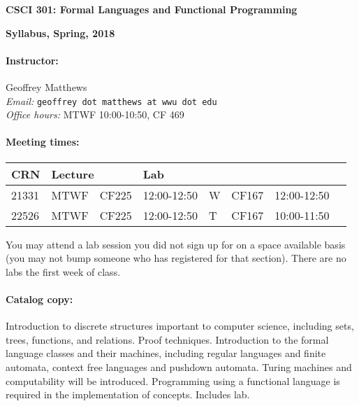 \documentclass{article}
\begin{document}
\centerline{\Large\bf CSCI 301: Formal Languages and Functional Programming}
\centerline{\large\bf Syllabus, Spring, 2018}

\paragraph{Instructor:} Geoffrey Matthews\\
{\em Email:} {\tt geoffrey dot matthews at wwu dot edu}\\
{\em Office hours:} MTWF 10:00-10:50, CF 469

\paragraph{Meeting times:} \mbox{}

  \begin{tabular}{l|ll|lllll}
    CRN & \multicolumn{2}{l|}{Lecture}
    & \multicolumn{3}{l}{Lab}   \\\hline
    21331 & MTWF & CF225& 12:00-12:50  & W & CF167& 12:00-12:50 
\\
    22526 &  MTWF & CF225& 12:00-12:50  & T & CF167&  10:00-11:50 
    \\\hline
    \end{tabular}
	
  You  may attend a
  lab session you did not sign up for on a space available
  basis (you may not bump someone who has registered for
  that section).  There are no labs the first week of class.

\paragraph{Catalog copy:} Introduction to discrete structures important to
  computer science, including sets, trees, functions, and
  relations. Proof techniques. Introduction to the formal language
  classes and their machines, including regular languages and finite
  automata, context free languages and pushdown automata. Turing
  machines and computability will be introduced. Programming using a
  functional language is required in the implementation of
  concepts. Includes lab.
\end{document}
